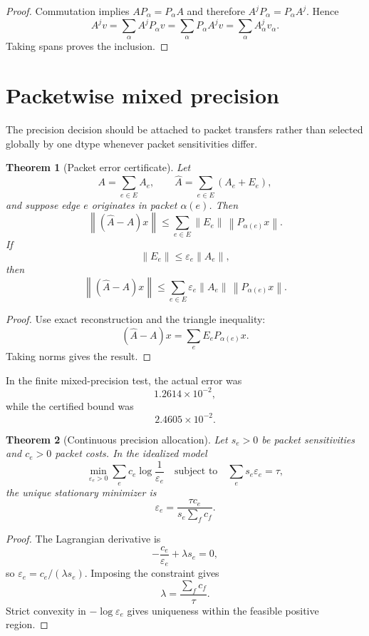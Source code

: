 \documentclass[11pt]{article}
\newtheorem{theorem}{Theorem}[section]
\theoremstyle{definition}
\theoremstyle{remark}
\newcommand{\norm}[1]{\left\lVert#1\right\rVert}
\begin{document}
\begin{proof}
Commutation implies $AP_\alpha=P_\alpha A$ and therefore $A^jP_\alpha=P_\alpha A^j$. Hence
\[
A^jv=\sum_\alpha A^jP_\alpha v
      =\sum_\alpha P_\alpha A^jv
      =\sum_\alpha A_\alpha^jv_\alpha.
\]
Taking spans proves the inclusion.
\end{proof}

\section{Packetwise mixed precision}

The precision decision should be attached to packet transfers rather than selected globally by one dtype whenever packet sensitivities differ.

\begin{theorem}[Packet error certificate]
Let
\[
A=\sum_{e\in E}A_e,
\qquad
\widehat A=\sum_{e\in E}(A_e+E_e),
\]
and suppose edge $e$ originates in packet $\alpha(e)$. Then
\[
\boxed{
\norm{(\widehat A-A)x}
\le
\sum_{e\in E}\norm{E_e}\,\norm{P_{\alpha(e)}x}.
}
\]
If
\[
\norm{E_e}\le\varepsilon_e\norm{A_e},
\]
then
\[
\boxed{
\norm{(\widehat A-A)x}
\le
\sum_{e\in E}
\varepsilon_e\norm{A_e}\,\norm{P_{\alpha(e)}x}.
}
\]
\end{theorem}

\begin{proof}
Use exact reconstruction and the triangle inequality:
\[
(\widehat A-A)x=\sum_eE_eP_{\alpha(e)}x.
\]
Taking norms gives the result.
\end{proof}

In the finite mixed-precision test, the actual error was
\[
1.2614\times10^{-2},
\]
while the certified bound was
\[
2.4605\times10^{-2}.
\]

\begin{theorem}[Continuous precision allocation]
Let $s_e>0$ be packet sensitivities and $c_e>0$ packet costs. In the idealized model
\[
\min_{\varepsilon_e>0}
\sum_e c_e\log\frac1{\varepsilon_e}
\quad\text{subject to}\quad
\sum_es_e\varepsilon_e=\tau,
\]
the unique stationary minimizer is
\[
\boxed{
\varepsilon_e
 =\frac{\tau c_e}{s_e\sum_f c_f}.
}
\]
\end{theorem}

\begin{proof}
The Lagrangian derivative is
\[
-\frac{c_e}{\varepsilon_e}+\lambda s_e=0,
\]
so $\varepsilon_e=c_e/(\lambda s_e)$. Imposing the constraint gives
\[
\lambda=\frac{\sum_fc_f}{\tau}.
\]
Strict convexity in $-\log\varepsilon_e$ gives uniqueness within the feasible positive region.
\end{proof}
\end{document}

